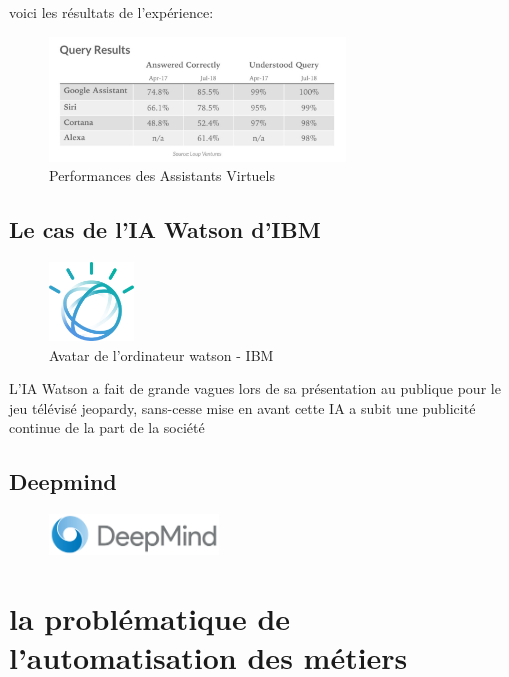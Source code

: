 voici les résultats de l'expérience:
\begin{figure}[h]
    \centering
    \includegraphics[width=0.7\textwidth]{Images/vaqueryresult}
    \caption{Performances des Assistants Virtuels}
    \label{fig:virtualassistant}
\end{figure}



\subsection{Le cas de l'IA Watson d'IBM}

\begin{figure}[!h]
    \centering
    \includegraphics[width=0.2\textwidth]{Images/watsonlogo}
    \caption{Avatar de l'ordinateur watson - IBM}
    \label{fig:watsonlogo}
\end{figure}
L'IA Watson a fait de grande vagues lors de sa présentation au publique pour le jeu télévisé jeopardy,
sans-cesse mise en avant cette IA a subit une publicité continue de la part de la société


\subsection{Deepmind}
\begin{figure}[h]
    \centering
    \includegraphics[width=0.4\textwidth]{Images/deepmindlogo}
    \label{fig:deepmindlogo}
\end{figure}

\section{la problématique de l'automatisation des métiers}


